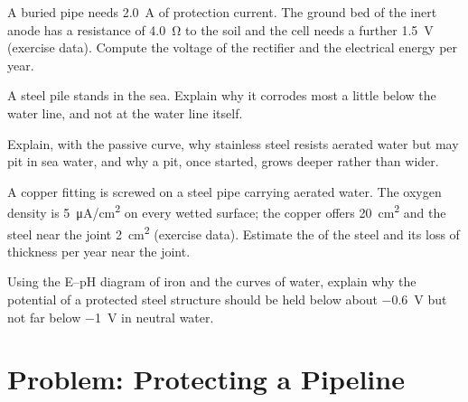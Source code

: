 \begin{exercise}[$\star\star$]\label{exo:b2:corrosion:8}
A buried pipe needs \qty{2.0}{A} of protection current. The ground bed of the
inert anode has a resistance of \qty{4.0}{\ohm} to the soil and the cell needs a
further \qty{1.5}{V} (exercise data). Compute the voltage of the rectifier and the
electrical energy per year.
\end{exercise}

\begin{exercise}[$\star\star$]\label{exo:b2:corrosion:9}
A steel pile stands in the sea. Explain why it corrodes most a little below
the water line, and not at the water line itself.
\end{exercise}

\begin{exercise}[$\star\star\star$]\label{exo:b2:corrosion:10}
Explain, with the passive curve, why stainless steel resists aerated water but
may pit in sea water, and why a pit, once started, grows deeper rather than
wider.
\end{exercise}

\begin{exercise}[$\star\star\star$]\label{exo:b2:corrosion:11}
A copper fitting is screwed on a steel pipe carrying aerated water. The oxygen
 density is \qty{5}{\micro A/cm^2} on every wetted surface; the
copper offers \qty{20}{cm^2} and the steel near the joint \qty{2}{cm^2}
(exercise data). Estimate the  of the steel and its loss of
thickness per year near the joint.
\end{exercise}

\begin{exercise}[$\star\star\star$]\label{exo:b2:corrosion:12}
Using the E--pH diagram of iron and the curves of water, explain why the
potential of a protected steel structure should be held below about
\qty{-0.6}{V} but not far below \qty{-1}{V} in neutral water.
\end{exercise}

\section{Problem: Protecting a Pipeline}

